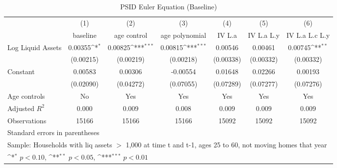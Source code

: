 {
\def\sym#1{\ifmmode^{#1}\else\(^{#1}\)\fi}
\begin{longtable}{l*{6}{c}}
\caption{PSID Euler Equation (Baseline)}\\
\toprule\endfirsthead\midrule\endhead\midrule\endfoot\endlastfoot
                    &\multicolumn{1}{c}{(1)}&\multicolumn{1}{c}{(2)}&\multicolumn{1}{c}{(3)}&\multicolumn{1}{c}{(4)}&\multicolumn{1}{c}{(5)}&\multicolumn{1}{c}{(6)}\\
                    &\multicolumn{1}{c}{baseline}&\multicolumn{1}{c}{age control}&\multicolumn{1}{c}{age polynomial}&\multicolumn{1}{c}{IV L.a}&\multicolumn{1}{c}{IV L.a L.y}&\multicolumn{1}{c}{IV L.a L.c L.y}\\
\midrule
Log Liquid Assets   &     0.00355\sym{*}  &     0.00825\sym{***}&     0.00815\sym{***}&     0.00546         &     0.00461         &     0.00745\sym{**} \\
                    &   (0.00215)         &   (0.00219)         &   (0.00218)         &   (0.00338)         &   (0.00332)         &   (0.00332)         \\
\addlinespace
Constant            &     0.00583         &     0.00306         &    -0.00554         &     0.01648         &     0.02266         &     0.00193         \\
                    &   (0.02090)         &   (0.04272)         &   (0.07055)         &   (0.07289)         &   (0.07277)         &   (0.07276)         \\
\addlinespace
Age controls        &          No         &         Yes         &         Yes         &         Yes         &         Yes         &         Yes         \\
\midrule
Adjusted \(R^{2}\)  &       0.000         &       0.009         &       0.008         &       0.009         &       0.009         &       0.009         \\
Observations        &       15166         &       15166         &       15166         &       15092         &       15092         &       15092         \\
\bottomrule
\multicolumn{7}{l}{\footnotesize Standard errors in parentheses}\\
\multicolumn{7}{l}{\footnotesize Sample: Households with liq assets $>$ 1,000 at time t and t-1, ages 25 to 60, not moving homes that year}\\
\multicolumn{7}{l}{\footnotesize \sym{*} \(p<0.10\), \sym{**} \(p<0.05\), \sym{***} \(p<0.01\)}\\
\end{longtable}
}
